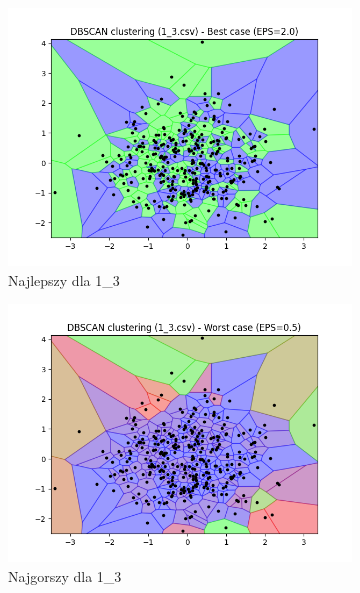\documentclass[12pt]{article}
\begin{document}
\begin{figure}[H]
\begin{subfigure}[b]{0.24\textwidth}
        \includegraphics[width=\linewidth]{img/exp_1/dbscan/1_3_best.png}
        \caption{Najlepszy dla 1\_3}
    \end{subfigure}
    \hfill
    \begin{subfigure}[b]{0.24\textwidth}
        \includegraphics[width=\linewidth]{img/exp_1/dbscan/1_3_worst.png}
        \caption{Najgorszy dla 1\_3}
    \end{subfigure}
    \hfill
    \begin{subfigure}[b]{0.24\textwidth}

\end{subfigure}
\end{figure}
\end{document}
